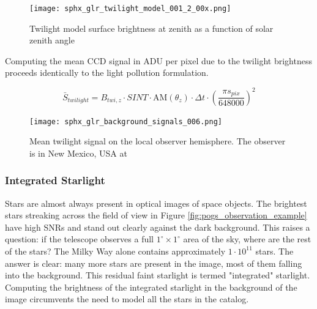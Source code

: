 \begin{figure}[ht]
  \centering
  \texttt{[image: sphx\_glr\_twilight\_model\_001\_2\_00x.png]}
  \caption{Twilight model surface brightness at zenith as a function of solar zenith angle}
  \label{fig:twilight_model}
\end{figure}

Computing the mean CCD signal in ADU per pixel due to the twilight brightness proceeds identically to the light pollution formulation. 

\begin{equation} \label{eq:twilight_adu}
  \bar{S}_{twilight} = B_{twi,z} \cdot SINT \cdot \textrm{AM}(\theta_z) \cdot \Delta t \cdot \left( \frac{\pi s_{pix}}{648000} \right)^2
\end{equation}

\begin{figure}[ht]
  \centering
  \texttt{[image: sphx\_glr\_background\_signals\_006.png]}
  \caption{Mean twilight signal on the local observer hemisphere. The observer is in New Mexico, USA at
  \pogslla}
  \label{fig:pollution_hemi}
\end{figure}

\subsubsection{Integrated Starlight}

Stars are almost always present in optical images of space objects. The brightest stars streaking across the field of view in Figure \ref{fig:pogs_observation_example} have high SNRs and stand out clearly against the dark background. This raises a question: if the telescope observes a full $1^\circ \times 1^\circ$ area of the sky, where are the rest of the stars? The Milky Way alone contains approximately $1\cdot10^{11}$ stars. The answer is clear: many more stars are present in the image, most of them falling into the background. This residual faint starlight is termed "integrated" starlight. Computing the brightness of the integrated starlight in the background of the image circumvents the need to model all the stars in the catalog.

